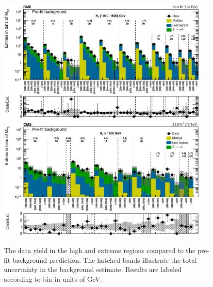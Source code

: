 \begin{figure}
	\centering
	\includegraphics[width=0.95\textwidth]{results/figs/mt2_highHT_fullEstimate}
	\includegraphics[width=0.95\textwidth]{results/figs/mt2_extremeHT_fullEstimate}
	\renewcommand{\baselinestretch}{1.0}
	\caption[The data yield in the high \HT and extreme \HT regions compared to the pre-fit background prediction.]{The data yield in the high \HT and extreme \HT regions compared to the pre-fit background prediction. The hatched bands illustrate the total uncertainty in the background estimate. Results are labeled according to \mttwo bin in units of GeV.}
	\label{fig:yieldPrefit3}
\end{figure}


